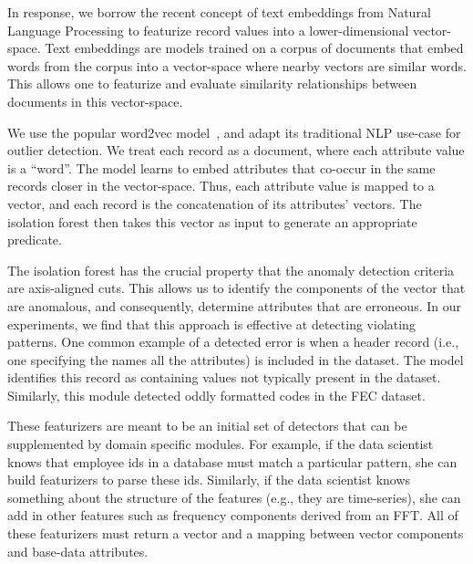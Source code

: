 In response, we borrow the recent concept of text embeddings from Natural Language Processing to featurize record values into a lower-dimensional vector-space.  
Text embeddings are models trained on a corpus of documents that embed words from the corpus into a vector-space where nearby vectors are similar words.
This allows one to featurize and evaluate similarity relationships between documents in this vector-space.

We use the popular \textsf{word2vec} model~\cite{mikolov2013distributed}, and adapt its traditional NLP use-case for outlier detection. 
We treat each record as a document, where each attribute value is a ``word''. 
The model learns to embed attributes that co-occur in the same records closer in the vector-space.
Thus, each attribute value is mapped to a vector, and each record is the concatenation of its attributes' vectors.  
The isolation forest then takes this vector as input to generate an appropriate predicate.  

The isolation forest has the crucial property that the anomaly detection criteria are axis-aligned cuts.
This allows us to identify the components of the vector that are anomalous, and consequently, determine attributes that are erroneous.
In our experiments, we find that this approach is effective at detecting violating patterns. 
One common example of a detected error is when a header record (i.e., one specifying the names all the attributes) is included in the dataset.
The model identifies this record as containing values not typically present in the dataset.
Similarly, this module detected oddly formatted codes in the FEC dataset.

 These featurizers are meant to be an initial set of detectors that can be supplemented by domain specific modules. For example, if the data scientist knows that employee ids in a database must match a particular pattern, she can build featurizers to parse these ids. Similarly, if the data scientist knows something about the structure of the features (e.g., they are time-series), she can add in other features such as frequency components derived from an FFT. All of these featurizers must return a vector and a mapping between vector components and base-data attributes.


\iffalse
